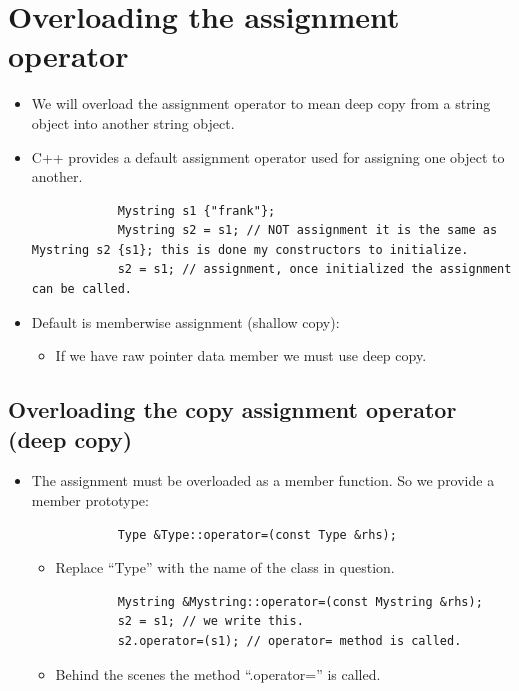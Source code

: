 \section{Overloading the assignment operator}
\begin{itemize}
    \item We will overload the assignment operator to mean deep copy from a string object into another string object.
    \item C++ provides a default assignment operator used for assigning one object to another.
        \begin{verbatim}
            Mystring s1 {"frank"};
            Mystring s2 = s1; // NOT assignment it is the same as Mystring s2 {s1}; this is done my constructors to initialize.
            s2 = s1; // assignment, once initialized the assignment can be called.
        \end{verbatim}
    
    \item Default is memberwise assignment (shallow copy):
        \begin{itemize}
            \item If we have raw pointer data member we must use deep copy.
        \end{itemize}
\end{itemize}

\subsection{Overloading the copy assignment operator (deep copy)}
\begin{itemize}
    \item The assignment must be overloaded as a member function. So we provide a member prototype:
        \begin{verbatim}
            Type &Type::operator=(const Type &rhs);
        \end{verbatim}
        \begin{itemize}
            \item Replace ``Type'' with the name of the class in question.
        \end{itemize}
        \begin{verbatim}
            Mystring &Mystring::operator=(const Mystring &rhs);
            s2 = s1; // we write this.
            s2.operator=(s1); // operator= method is called.
        \end{verbatim}
        \begin{itemize}
            \item Behind the scenes the method ``.operator='' is called.
        \end{itemize}
\end{itemize}

